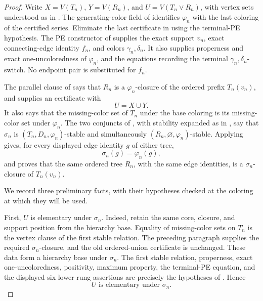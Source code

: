\begin{proof}
Write $X=V(T_n)$, $Y=V(R_n)$, and
$U=V(T_n\vee R_n)$, with vertex sets understood as in
.  The generating-color field of
 identifies $\varphi_n$ with the last
coloring of the certified series.  Eliminate the last certificate in
 using the terminal-PE hypothesis.  The PE
constructor of  supplies the exact support
$v_n$, exact connecting-edge identity $f_n$, and colors
$\gamma_n,\delta_n$.  It also supplies properness and exact
one-uncoloredness of $\varphi_n$, and the equations recording the
terminal $\gamma_n,\delta_n$-switch.  No endpoint pair is substituted
for $f_n$.

The parallel clause of  says that $R_n$ is a
$\varphi_n$-closure of the ordered prefix $T_n(v_n)$, and supplies
an  certificate with
\[
                         U=X\cup Y.                       \tag{1}
\]
It also says that the missing-color set of $T_n$ under the base
coloring is its missing-color set under $\varphi_n$.
The two conjuncts of , with stability
expanded as in , say that
$\sigma_n$ is $(T_n,D_n,\varphi_n)$-stable and simultaneously
$(R_n,\varnothing,\varphi_n)$-stable.  Applying
 gives, for every displayed edge
identity $g$ of either tree,
\[
             \sigma_n(g)=\varphi_n(g),                    \tag{2}
\]
and proves that the same ordered tree $R_n$, with the same edge
identities, is a $\sigma_n$-closure of $T_n(v_n)$.

We record three preliminary facts, with their hypotheses checked at the
coloring at which they will be used.

First, $U$ is elementary under $\sigma_n$.  Indeed, retain the same
core, closure, and support position from the hierarchy base.  Equality
of missing-color sets on $T_n$ is the vertex clause of the first stable
relation.  The preceding paragraph supplies the required
$\sigma_n$-closure, and the old ordered-union certificate is unchanged.
These data form a hierarchy base under $\sigma_n$.  The first stable
relation, properness, exact one-uncoloredness, positivity, maximum
property, the terminal-PE equation, and the displayed six lower-rung
assertions are precisely the hypotheses of
.  Hence
\[
                  U\text{ is elementary under }\sigma_n.   \tag{3}
\]


\end{proof}
